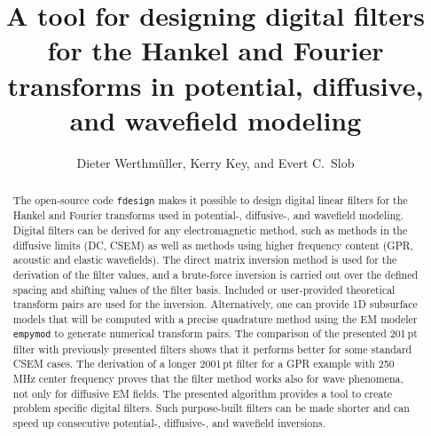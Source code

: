 \documentclass[paper,twocolumn,twoside]{geophysics}
\begin{document}
\title{A tool for designing digital filters for the Hankel and Fourier transforms in
potential, diffusive, and wavefield modeling}

\renewcommand{\thefootnote}{\fnsymbol{footnote}}


\address{
\footnotemark[1]Instituto Mexicano del Petróleo,
Eje Central Lázaro Cárdenas Norte 152,
Col. San Bartolo Atepehuacan C.P. 07730,
Ciudad de México, México,
E-mail: \href{mailto:dieter@werthmuller.org}{Dieter@Werthmuller.org};
\footnotemark[2]Lamont-Doherty Earth Observatory, Columbia University,
305C Oceanography,
61 Route 9W, PO Box 1000,
Palisades NY 10964-8000 US,
E-mail: \href{mailto:KKey@ldeo.columbia.edu}{KKey@ldeo.columbia.edu};
\footnotemark[3]TU Delft,
Building 23,
Stevinweg 1 / PO-box 5048,
2628 CN Delft,
E-mail: \href{mailto:E.C.Slob@tudelft.nl}{E.C.Slob@tudelft.nl}.}


\author{%
Dieter Werthmüller\footnotemark[1], %
Kerry Key\footnotemark[2], and %
Evert C.\ Slob\footnotemark[3]%
}

\footer{}

\maketitle

\begin{abstract} %
%
  The open-source code \texttt{fdesign} makes it possible to design digital
  linear filters for the Hankel and Fourier transforms used in potential-,
  diffusive-, and wavefield modeling. Digital filters can be derived for any
  electromagnetic method, such as methods in the diffusive limits (DC, CSEM) as
  well as methods using higher frequency content (GPR, acoustic and elastic
  wavefields).
%
  The direct matrix inversion method is used for the derivation of the filter
  values, and a brute-force inversion is carried out over the defined spacing
  and shifting values of the filter basis. Included or user-provided
  theoretical transform pairs are used for the inversion. Alternatively, one
  can provide 1D subsurface models that will be computed with a precise
  quadrature method using the EM modeler \texttt{empymod} to generate
  numerical transform pairs.
%
  The comparison of the presented 201\,pt filter with previously presented
  filters shows that it performs better for some standard CSEM cases. The
  derivation of a longer 2001\,pt filter for a GPR example with 250\,MHz center
  frequency proves that the filter method works also for wave phenomena, not
  only for diffusive EM fields.
%
  The presented algorithm provides a tool to create problem specific digital
  filters. Such purpose-built filters can be made shorter and can speed up
  consecutive  potential-, diffusive-, and wavefield inversions.
%
\end{abstract}
\end{document}
